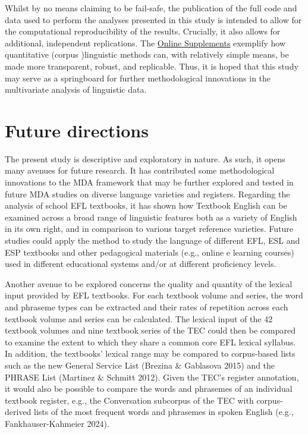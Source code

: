 \documentclass[
  letterpaper,
  DIV=11,
  numbers=noendperiod]{scrreprt}
\begin{document}
Whilst by no means claiming to be fail-safe, the publication of the full
code and data used to perform the analyses presented in this study is
intended to allow for the computational reproducibility of the results.
Crucially, it also allows for additional, independent replications. The
\href{https://elenlefoll.github.io/TextbookMDA}{Online Supplements}
exemplify how quantitative (corpus )linguistic methods can, with
relatively simple means, be made more transparent, robust, and
replicable. Thus, it is hoped that this study may serve as a springboard
for further methodological innovations in the multivariate analysis of
linguistic data.

\section{Future directions}\label{future-directions}

The present study is descriptive and exploratory in nature. As such, it
opens many avenues for future research. It has contributed some
methodological innovations to the MDA framework that may be further
explored and tested in future MDA studies on diverse language varieties
and registers. Regarding the analysis of school EFL textbooks, it has
shown how Textbook English can be examined across a broad range of
linguistic features both as a variety of English in its own right, and
in comparison to various target reference varieties. Future studies
could apply the method to study the language of different EFL, ESL and
ESP textbooks and other pedagogical materials (e.g., online e learning
courses) used in different educational systems and/or at different
proficiency levels.

Another avenue to be explored concerns the quality and quantity of the
lexical input provided by EFL textbooks. For each textbook volume and
series, the word and phraseme types can be extracted and their rates of
repetition across each textbook volume and series can be calculated. The
lexical input of the 42 textbook volumes and nine textbook series of the
TEC could then be compared to examine the extent to which they share a
common core EFL lexical syllabus. In addition, the textbooks' lexical
range may be compared to corpus-based lists such as the new General
Service List (Brezina \& Gablasova 2015) and the PHRASE List (Martinez
\& Schmitt 2012). Given the TEC's register annotation, it would also be
possible to compare the words and phrasemes of an individual textbook
register, e.g., the Conversation subcorpus of the TEC with
corpus-derived lists of the most frequent words and phrasemes in spoken
English (e.g., Fankhauser-Kahmeier 2024).
\end{document}

